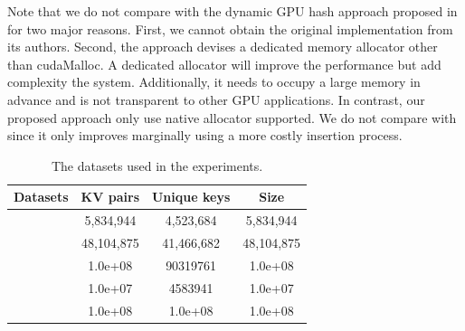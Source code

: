 Note that we do not compare with the dynamic GPU hash approach proposed in \cite{ashkiani2018dynamic} for two major reasons. First, we cannot obtain the original implementation from its authors. Second, the approach devises a dedicated memory allocator other than cudaMalloc. A dedicated allocator will improve the performance but add complexity the system. Additionally, it needs to occupy a large memory in advance and is not transparent to other GPU applications.
In contrast, our proposed approach only use native allocator supported. 
We do not compare with \cite{breslow2016horton} since it only improves \megakv marginally using a more costly insertion process.

\begin{table}[t]
	\caption{The datasets used in the experiments.}
	\label{table:exp_data_sets}
	\centering
	\begin{tabular}{|c|c|c|c|}
		\hline
		Datasets & KV pairs & Unique keys & Size \\ \hline
		\dstwitter &5,834,944 & 4,523,684&5,834,944\\ \hline
		\dsreddit & 48,104,875 & 41,466,682 & 48,104,875\\ \hline
		\dstpch &1.0e+08 & 90319761&1.0e+08 \\ \hline
		\dsali &1.0e+07 & 4583941&1.0e+07 \\ \hline
		\dsrandom & 1.0e+08& 1.0e+08&1.0e+08 \\ \hline
	\end{tabular}
\end{table}

